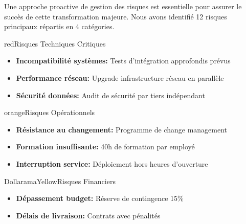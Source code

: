 \documentclass{TemplatesParametriques/dollarama}
\begin{document}

\begin{dollaramarisks}{
    Une approche proactive de gestion des risques est essentielle pour assurer le succès de cette transformation majeure. Nous avons identifié 12 risques principaux répartis en 4 catégories.
}
    \begin{dollaramariskcategory}{red}{Risques Techniques Critiques}
        \begin{itemize}
            \item \textbf{Incompatibilité systèmes:} Tests d'intégration approfondis prévus
            \item \textbf{Performance réseau:} Upgrade infrastructure réseau en parallèle
            \item \textbf{Sécurité données:} Audit de sécurité par tiers indépendant
        \end{itemize}
    \end{dollaramariskcategory}
    
    \begin{dollaramariskcategory}{orange}{Risques Opérationnels}
        \begin{itemize}
            \item \textbf{Résistance au changement:} Programme de change management
            \item \textbf{Formation insuffisante:} 40h de formation par employé
            \item \textbf{Interruption service:} Déploiement hors heures d'ouverture
        \end{itemize}
    \end{dollaramariskcategory}
    
    \begin{dollaramariskcategory}{DollaramaYellow}{Risques Financiers}
        \begin{itemize}
            \item \textbf{Dépassement budget:} Réserve de contingence 15\%
            \item \textbf{Délais de livraison:} Contrats avec pénalités
        \end{itemize}
    \end{dollaramariskcategory}
\end{dollaramarisks}

\end{document}
